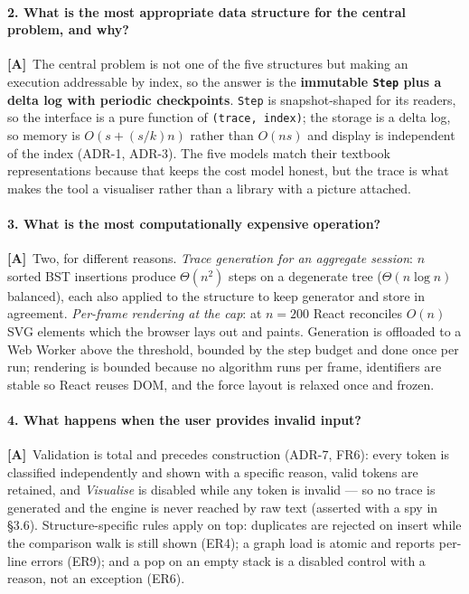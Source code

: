 \documentclass[11pt,a4paper]{article}
\newcommand{\A}{\textcolor{asmc}{\textbf{[A]}}}     %
\newcommand{\ct}[1]{\texttt{#1}}
\begin{document}
\paragraph{2. What is the most appropriate data structure for the central problem, and why?}
\A\ The central problem is not one of the five structures but making an execution addressable by
index, so the answer is the \textbf{immutable \ct{Step} plus a delta log with periodic
checkpoints}. \ct{Step} is snapshot-shaped for its readers, so the interface is a pure function
of \ct{(trace, index)}; the storage is a delta log, so memory is $O(s + (s/k)n)$ rather than
$O(ns)$ and display is independent of the index (ADR-1, ADR-3). The five models match their
textbook representations because that keeps the cost model honest, but the trace is what makes
the tool a visualiser rather than a library with a picture attached.

\paragraph{3. What is the most computationally expensive operation?}
\A\ Two, for different reasons. \emph{Trace generation for an aggregate session}: $n$ sorted BST
insertions produce $\Theta(n^2)$ steps on a degenerate tree ($\Theta(n\log n)$ balanced), each
also applied to the structure to keep generator and store in agreement. \emph{Per-frame rendering
at the cap}: at $n=200$ React reconciles $O(n)$ SVG elements which the browser lays out and
paints. Generation is offloaded to a Web Worker above the threshold, bounded by the step budget
and done once per run; rendering is bounded because no algorithm runs per frame, identifiers are
stable so React reuses DOM, and the force layout is relaxed once and frozen.

\paragraph{4. What happens when the user provides invalid input?}
\A\ Validation is total and precedes construction (ADR-7, FR6): every token is classified
independently and shown with a specific reason, valid tokens are retained, and \emph{Visualise}
is disabled while any token is invalid --- so no trace is generated and the engine is never
reached by raw text (asserted with a spy in \S3.6). Structure-specific rules apply on top:
duplicates are rejected on insert while the comparison walk is still shown (ER4); a graph load is
atomic and reports per-line errors (ER9); and a pop on an empty stack is a disabled control with
a reason, not an exception (ER6).
\end{document}
